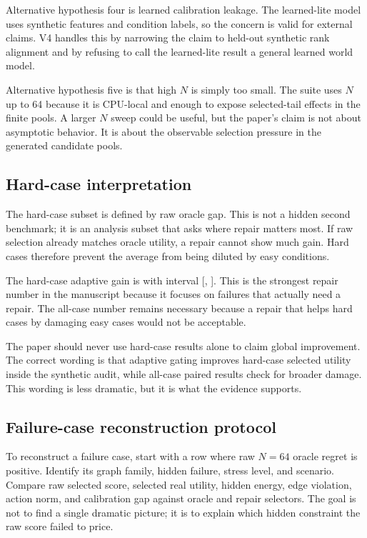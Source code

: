 \documentclass{article}
\begin{document}
Alternative hypothesis four is learned calibration leakage.  The learned-lite
model uses synthetic features and condition labels, so the concern is valid for
external claims.  V4 handles this by narrowing the claim to held-out synthetic
rank alignment and by refusing to call the learned-lite result a general learned
world model.

Alternative hypothesis five is that high \(N\) is simply too small.  The suite
uses \(N\) up to 64 because it is CPU-local and enough to expose selected-tail
effects in the finite pools.  A larger \(N\) sweep could be useful, but the
paper's claim is not about asymptotic behavior.  It is about the observable
selection pressure in the generated candidate pools.

\subsection{Hard-case interpretation}

The hard-case subset is defined by raw oracle gap.  This is not a hidden second
benchmark; it is an analysis subset that asks where repair matters most.  If
raw selection already matches oracle utility, a repair cannot show much gain.
Hard cases therefore prevent the average from being diluted by easy conditions.

The hard-case adaptive gain is \VFourGraphHardAdaptiveGain{} with interval
[\VFourGraphHardAdaptiveLow{}, \VFourGraphHardAdaptiveHigh{}].  This is the
strongest repair number in the manuscript because it focuses on failures that
actually need a repair.  The all-case number remains necessary because a repair
that helps hard cases by damaging easy cases would not be acceptable.

The paper should never use hard-case results alone to claim global improvement.
The correct wording is that adaptive gating improves hard-case selected utility
inside the synthetic audit, while all-case paired results check for broader
damage.  This wording is less dramatic, but it is what the evidence supports.

\subsection{Failure-case reconstruction protocol}

To reconstruct a failure case, start with a row where raw \(N=64\) oracle regret
is positive.  Identify its graph family, hidden failure, stress level, and
scenario.  Compare raw selected score, selected real utility, hidden energy,
edge violation, action norm, and calibration gap against oracle and repair
selectors.  The goal is not to find a single dramatic picture; it is to explain
which hidden constraint the raw score failed to price.
\end{document}
